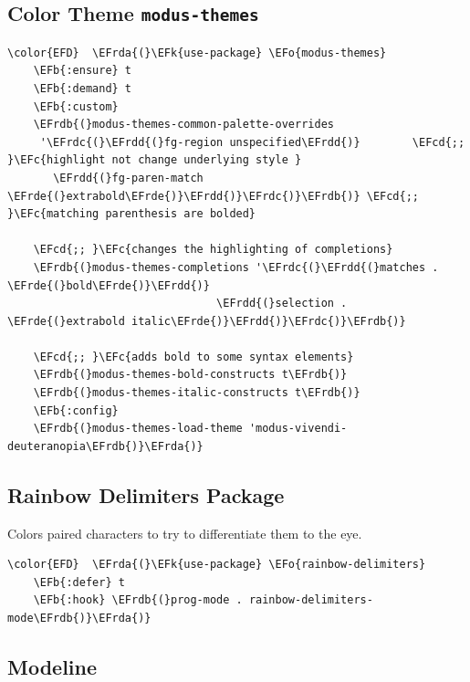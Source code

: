 \documentclass[11pt]{article}
\newcommand{\EFc}[1]{\textcolor{EFc}{#1}} %
\newcommand{\EFcd}[1]{\textcolor{EFcd}{#1}} %
\newcommand{\EFk}[1]{\textcolor{EFk}{#1}} %
\newcommand{\EFb}[1]{\textcolor{EFb}{#1}} %
\newcommand{\EFo}[1]{\textcolor{EFo}{#1}} %
\newcommand{\EFrda}[1]{\textcolor{EFrda}{#1}} %
\newcommand{\EFrdb}[1]{\textcolor{EFrdb}{#1}} %
\newcommand{\EFrdc}[1]{\textcolor{EFrdc}{#1}} %
\newcommand{\EFrdd}[1]{\textcolor{EFrdd}{#1}} %
\newcommand{\EFrde}[1]{\textcolor{EFrde}{#1}} %
\begin{document}
\subsection{Color Theme \texttt{modus-themes}}
\label{sec:org3419fbc}
\begin{Code}
\begin{Verbatim}
\color{EFD}  \EFrda{(}\EFk{use-package} \EFo{modus-themes}
    \EFb{:ensure} t
    \EFb{:demand} t
    \EFb{:custom}
    \EFrdb{(}modus-themes-common-palette-overrides
     '\EFrdc{(}\EFrdd{(}fg-region unspecified\EFrdd{)}        \EFcd{;; }\EFc{highlight not change underlying style }
       \EFrdd{(}fg-paren-match \EFrde{(}extrabold\EFrde{)}\EFrdd{)}\EFrdc{)}\EFrdb{)} \EFcd{;; }\EFc{matching parenthesis are bolded}

    \EFcd{;; }\EFc{changes the highlighting of completions}
    \EFrdb{(}modus-themes-completions '\EFrdc{(}\EFrdd{(}matches . \EFrde{(}bold\EFrde{)}\EFrdd{)}
                                \EFrdd{(}selection . \EFrde{(}extrabold italic\EFrde{)}\EFrdd{)}\EFrdc{)}\EFrdb{)}

    \EFcd{;; }\EFc{adds bold to some syntax elements}
    \EFrdb{(}modus-themes-bold-constructs t\EFrdb{)}
    \EFrdb{(}modus-themes-italic-constructs t\EFrdb{)}
    \EFb{:config}
    \EFrdb{(}modus-themes-load-theme 'modus-vivendi-deuteranopia\EFrdb{)}\EFrda{)}
\end{Verbatim}
\end{Code}
\subsection{Rainbow Delimiters Package}
\label{sec:orgdbe9ef0}
Colors paired characters to try to differentiate them to the eye.

\begin{Code}
\begin{Verbatim}
\color{EFD}  \EFrda{(}\EFk{use-package} \EFo{rainbow-delimiters}
    \EFb{:defer} t
    \EFb{:hook} \EFrdb{(}prog-mode . rainbow-delimiters-mode\EFrdb{)}\EFrda{)}
\end{Verbatim}
\end{Code}
\subsection{Modeline}
\label{sec:orge7555cc}
\end{document}
